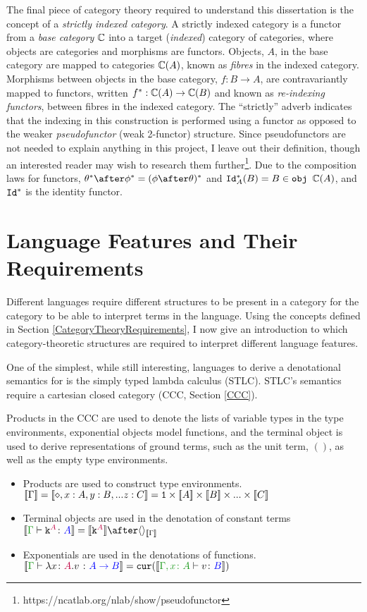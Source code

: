 The final piece of category theory required to understand this dissertation is the concept of a \textit{strictly indexed category}. A strictly indexed category is a functor from a \textit{base category} $\mathbb{C}$ into a target (\textit{indexed}) category of categories, where objects are categories and morphisms are functors. Objects, $A$, in the base category are mapped to categories $\mathbb{C}(A)$, known as \textit{fibres} in the indexed category. Morphisms between objects in the base category, $f: B\rightarrow A$, are contravariantly mapped to functors, written $f^*: \mathbb{C}(A)\rightarrow \mathbb{C}(B)$ and known as \textit{re-indexing functors}, between fibres in the indexed category. The ``strictly'' adverb indicates that the indexing in this construction is performed using a functor as opposed to the weaker \textit{pseudofunctor} (weak 2-functor) structure. Since pseudofunctors are not needed to explain anything in this project, I leave out their definition, though an interested reader may wish to research them further\footnote{https://ncatlab.org/nlab/show/pseudofunctor}.  Due to the composition laws for functors, $\theta\star\after\phi\star = (\phi\after\theta)\star$ and $\texttt{Id}_{A}^*(B) = B\in\texttt{obj } \mathbb{C}(A)$, and $\texttt{Id}_{}^*$ is the identity functor.
\section{Language Features and Their Requirements}\label{LanguageFeatureRequirements}


Different languages require different structures to be present in a category for the category to be able to interpret terms in the language. Using the concepts defined in Section \ref{CategoryTheoryRequirements}, I now give an introduction to which category-theoretic structures are required to interpret different language features. 

One of the simplest, while still interesting, languages to derive a denotational semantics for is the simply typed lambda calculus (STLC)\@. STLC's semantics require a cartesian closed category (CCC, Section \ref{CCC}).

Products in the CCC are used to denote the lists of variable types in the type environments, exponential objects model functions, and the terminal object is used to derive representations of ground terms, such as the unit term, $()$, as well as the empty type environments.

\begin{itemize}
    \item Products are used to construct type environments. $\deno{\G} = \deno{\nil, x: A, y:B, ... z:C} = \1 \times \deno{A} \times \deno{B} \times ... \times \deno{C}$
    \item Terminal objects are used in the denotation of constant terms $\deno{\gtyperelation{\const{A}}{A}} = \deno{\const{A}}\after\term{\deno{\G}}$
    \item Exponentials are used in the denotations of functions. $\deno{\typerelation{\G}{\lam{x}{A}{v}}{\ab}} = \cur{\deno{\typerelation{\gax}{v}{B}}}$
\end{itemize}

